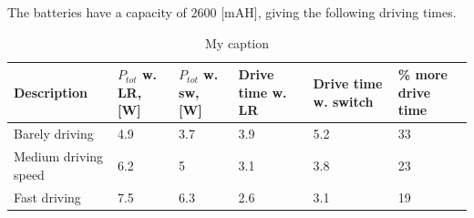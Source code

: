 The batteries have a capacity of $2600$ [mAH], giving the following driving times.


\begin{table}[H]
\centering
\caption{My caption}
\label{my-label}
\begin{tabular}{|l|l|p{2cm}|p{2cm}|p{2cm}|p{2cm}|}
\hline
\textbf{Description} & $P_{tot}$ w. LR, {[}W{]} & $P_{tot}$ w. sw, {[}W{]} & Drive time w. LR & Drive time w.  switch& \% more drive time \\ \hline
Barely driving       & 4.9                         & 3.7                               & 3.9              & 5.2                      & 33                 \\ \hline
Medium driving speed & 6.2                         & 5                                 & 3.1              & 3.8                      & 23                 \\ \hline
Fast driving         & 7.5                         & 6.3                               & 2.6              & 3.1                      & 19                 \\ \hline
\end{tabular}
\end{table}

